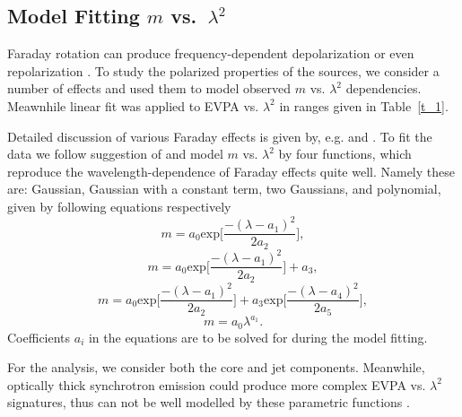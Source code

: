 \documentclass[a4paper,fleqn,usenatbib,useAMS]{mnras}
\begin{document}
\subsection{Model Fitting $m$ vs.\ $\lambda^2$}
\label{s:m_fit}
Faraday rotation can produce frequency-dependent depolarization or even repolarization \citep[e.g.][]{burn66,sokoloff_etal98}.
To study the polarized properties of the sources, we consider a number of effects and used them to model observed $m$ vs. $\lambda^2$ dependencies.
Meawnhile linear fit was applied to EVPA vs. $\lambda^2$ in ranges given in Table~\ref{t_1}.

Detailed discussion of various Faraday effects is given by, e.g. \citet{sokoloff_etal98} and \citet{farnes_etal14}.
To fit the data we follow suggestion of \citet{farnes_etal14} and model $m$ vs. $\lambda^2$ by four functions, which reproduce the wavelength-dependence of Faraday effects quite well. 
Namely these are: Gaussian, Gaussian with a constant term, two Gaussians, and  polynomial, given by following equations respectively
\begin{equation}
\label{eq_par1}
m = a_0 \mathrm{exp}\Big[ \frac{-(\lambda-a_1)^2}{2a_2} \Big], 
\end{equation}
\begin{equation}
m = a_0 \mathrm{exp}\Big[ \frac{-(\lambda-a_1)^2}{2a_2} \Big] + a_3, 
\end{equation}
\begin{equation}
m = a_0 \mathrm{exp}\Big[ \frac{-(\lambda-a_1)^2}{2a_2} \Big] + a_3 \mathrm{exp}\Big[ \frac{-(\lambda-a_4)^2}{2a_5} \Big], 
\end{equation}
\begin{equation}
\label{eq_par4}
m = a_0 \lambda^{a_1}.
\end{equation}
Coefficients $a_i$ in the equations are to be solved for during the model fitting.

For the analysis, we consider both the core and jet components. Meanwhile, optically thick synchrotron emission could produce more complex EVPA vs. $\lambda^2$ signatures, thus can not be well modelled by these parametric functions \citep[see][]{pacholczyk_swihart_67,fukui_73,jones_odell_77b}.
\end{document}
